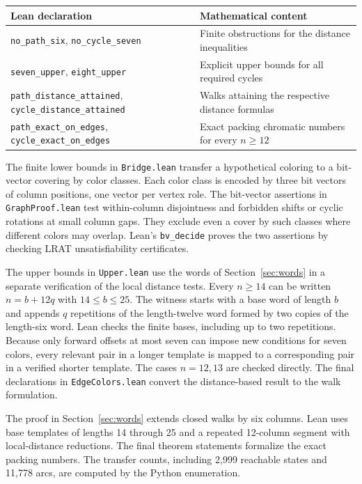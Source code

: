 \documentclass[11pt]{article}
\begin{document}
\begin{center}
\small
\begin{tabular}{@{}>{\raggedright\arraybackslash}p{.45\linewidth}>{\raggedright\arraybackslash}p{.49\linewidth}@{}}
\toprule
Lean declaration & Mathematical content\\
\midrule
\texttt{no\_path\_six}, \texttt{no\_cycle\_seven}
  & Finite obstructions for the distance inequalities\\
\texttt{seven\_upper}, \texttt{eight\_upper}
  & Explicit upper bounds for all required cycles\\
\texttt{path\_distance\_attained}, \texttt{cycle\_distance\_attained}
  & Walks attaining the respective distance formulas\\
\texttt{path\_exact\_on\_edges}, \texttt{cycle\_exact\_on\_edges}
  & Exact packing chromatic numbers for every \(n\ge12\)\\
\bottomrule
\end{tabular}
\end{center}

The finite lower bounds in \texttt{Bridge.lean} transfer a hypothetical
coloring to a bit-vector covering by color classes. Each color class
is encoded by three bit vectors of column positions, one vector per
vertex role. The bit-vector assertions in \texttt{GraphProof.lean}
test within-column disjointness and forbidden shifts or cyclic rotations
at small column gaps. They exclude even a cover by such classes where
different colors may overlap. Lean's \texttt{bv\_decide} proves the two
assertions by checking LRAT unsatisfiability certificates.

The upper bounds in \texttt{Upper.lean} use the words of
Section~\ref{sec:words} in a separate verification of the local distance
tests. Every \(n\ge14\) can be written \(n=b+12q\) with
\(14\le b\le25\). The witness starts with a base word of length \(b\)
and appends \(q\) repetitions of the length-twelve word formed by two
copies of the length-six word. Lean checks the finite bases, including
up to two repetitions. Because only forward offsets at most seven
can impose new conditions for seven colors, every relevant pair in a
longer template is mapped to a corresponding pair in a verified
shorter template. The cases \(n=12,13\) are checked directly.
The final declarations in \texttt{EdgeColors.lean} convert the
distance-based result to the walk formulation.

The proof in Section~\ref{sec:words} extends closed walks by six
columns. Lean uses base templates of lengths 14 through 25 and a
repeated 12-column segment with local-distance reductions. The final
theorem statements formalize the exact packing numbers. The transfer
counts, including 2,999 reachable states and 11,778 arcs, are computed
by the Python enumeration.
\end{document}

